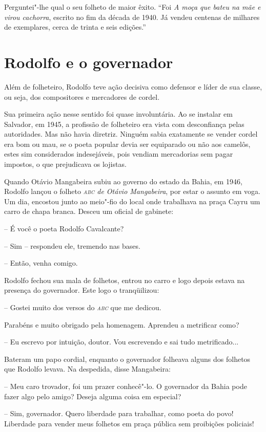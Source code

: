 Perguntei"-lhe qual o seu folheto de maior êxito. ``Foi
\textit{A moça que bateu na mãe e virou cachorra}, escrito no fim da
década de 1940. Já vendeu centenas de milhares de exemplares, cerca de
trinta e seis edições.''

\section{Rodolfo e o governador}

Além de folheteiro, Rodolfo teve ação decisiva como defensor e líder de
sua classe, ou seja, dos compositores e mercadores de cordel.

Sua primeira ação nesse sentido foi quase involuntária. Ao se instalar
em Salvador, em 1945, a profissão de folheteiro era vista com
desconfiança pelas autoridades. Mas não havia diretriz. Ninguém sabia
exatamente se vender cordel era bom ou mau, se o poeta popular devia
ser equiparado ou não aos camelôs, estes sim considerados indesejáveis,
pois vendiam mercadorias sem pagar impostos, o que prejudicava os
lojistas.

Quando Otávio Mangabeira subiu ao governo do estado da Bahia, em 1946,
Rodolfo lançou o folheto \textit{\textsc{abc} de Otávio Mangabeira}, por estar o
assunto em voga. Um dia, encostou junto ao meio"-fio do local onde
trabalhava na praça Cayru um carro de chapa branca. Desceu um oficial
de gabinete:

-- É você o poeta Rodolfo Cavalcante?

-- Sim -- respondeu ele, tremendo nas bases.

-- Então, venha comigo.

Rodolfo fechou sua mala de folhetos, entrou no carro e logo depois
estava na presença do governador. Este logo o tranqüilizou:

-- Gostei muito dos versos do \textit{\textsc{abc}} que me dedicou.

Parabéns e muito obrigado pela homenagem. Aprendeu a metrificar como?

-- Eu escrevo por intuição, doutor. Vou escrevendo e sai tudo
metrificado...

Bateram um papo cordial, enquanto o governador folheava alguns dos
folhetos que Rodolfo levava. Na despedida, disse Mangabeira:

-- Meu caro trovador, foi um prazer conhecê"-lo. O governador da
Bahia pode fazer algo pelo amigo? Deseja alguma coisa em especial?

-- Sim, governador. Quero liberdade para trabalhar, como poeta do
povo! Liberdade para vender meus folhetos em praça pública sem
proibições policiais!

